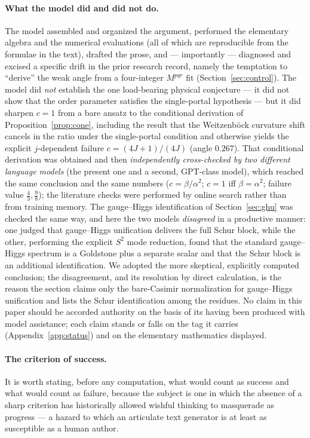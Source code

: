 \documentclass[11pt]{article}
\theoremstyle{plain}
\theoremstyle{definition}
\begin{document}
\paragraph{What the model did and did not do.}
The model assembled and organized the argument, performed the elementary
algebra and the numerical evaluations (all of which are reproducible from the
formulae in the text), drafted the prose, and --- importantly --- diagnosed
and excised a specific drift in the prior research record, namely the
temptation to ``derive'' the weak angle from a four-integer $M^{pqr}$ fit
(Section~\ref{sec:control}). The model did \emph{not} establish the one
load-bearing physical conjecture --- it did not show that the order parameter
satisfies the single-portal hypothesis --- but it did sharpen $c=1$ from a
bare ansatz to the conditional derivation of Proposition~\ref{prop:cone},
including the result that the Weitzenb\"ock curvature shift cancels in the
ratio under the single-portal condition and otherwise yields the explicit
$j$-dependent failure $c=(4J+1)/(4J)$ (angle $0.267$). That conditional
derivation was obtained and then \emph{independently cross-checked by two
different language models} (the present one and a second, GPT-class model),
which reached the same conclusion and the same numbers ($c=\beta/\alpha^2$;
$c=1$ iff $\beta=\alpha^2$; failure value $\tfrac43,\tfrac98$); the literature
checks were performed by online search rather than from training memory. The
gauge--Higgs identification of Section~\ref{sec:ghu} was checked the same way,
and here the two models \emph{disagreed} in a productive manner: one judged
that gauge--Higgs unification delivers the full Schur block, while the other,
performing the explicit $S^2$ mode reduction, found that the standard
gauge--Higgs spectrum is a Goldstone plus a separate scalar and that the
Schur block is an additional identification. We adopted the more skeptical,
explicitly computed conclusion; the disagreement, and its resolution by direct
calculation, is the reason the section claims only the bare-Casimir
normalization for gauge--Higgs unification and lists the Schur identification
among the residues. No claim in this paper should be accorded authority on
the basis of its having been produced with model assistance; each claim
stands or falls on the tag it carries (Appendix~\ref{app:status}) and on the
elementary mathematics displayed.

\paragraph{The criterion of success.}
It is worth stating, before any computation, what would count as success and
what would count as failure, because the subject is one in which the
absence of a sharp criterion has historically allowed wishful thinking to
masquerade as progress --- a hazard to which an articulate text generator is
at least as susceptible as a human author.
\end{document}
